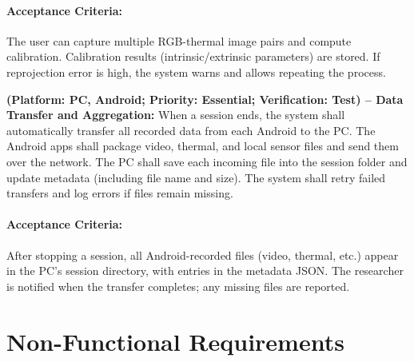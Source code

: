 \begin{description}[style=unboxed,leftmargin=0cm]
    \paragraph{Acceptance Criteria:} The user can capture multiple RGB-thermal image pairs and compute calibration. Calibration results (intrinsic/extrinsic parameters) are stored. If reprojection error is high, the system warns and allows repeating the process.

    \item[\textbf{FR10}] \textbf{(Platform: PC, Android; Priority: Essential; Verification: Test) – Data Transfer and Aggregation:} When a session ends, the system shall automatically transfer all recorded data from each Android to the PC. The Android apps shall package video, thermal, and local sensor files and send them over the network. The PC shall save each incoming file into the session folder and update metadata (including file name and size). The system shall retry failed transfers and log errors if files remain missing.
    \paragraph{Acceptance Criteria:} After stopping a session, all Android-recorded files (video, thermal, etc.) appear in the PC’s session directory, with entries in the metadata JSON. The researcher is notified when the transfer completes; any missing files are reported.
\end{description}

\section{Non-Functional Requirements}

